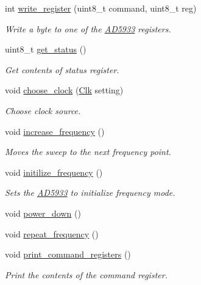 \begin{DoxyCompactItemize}
int \mbox{\hyperlink{struct_a_d5933_a19776e361cd7e0f8139637a186d83f63}{write\+\_\+register}} (uint8\+\_\+t command, uint8\+\_\+t reg)
\begin{DoxyCompactList}\small\item\em Write a byte to one of the \mbox{\hyperlink{struct_a_d5933}{A\+D5933}} registers. \end{DoxyCompactList}\item 
uint8\+\_\+t \mbox{\hyperlink{struct_a_d5933_aa2c2053a63395fc76be01a00b91e1bec}{get\+\_\+status}} ()
\begin{DoxyCompactList}\small\item\em Get contents of status register. \end{DoxyCompactList}\item 
void \mbox{\hyperlink{struct_a_d5933_ac1504cf786233e9802f80aac58a89ef7}{choose\+\_\+clock}} (\mbox{\hyperlink{ad5933_8hpp_a252769b931abfc990c5d5396cc352d35}{Clk}} setting)
\begin{DoxyCompactList}\small\item\em Choose clock source. \end{DoxyCompactList}\item 
void \mbox{\hyperlink{struct_a_d5933_ab0d13523bbb22eae6366815077540958}{increase\+\_\+frequency}} ()
\begin{DoxyCompactList}\small\item\em Moves the sweep to the next frequency point. \end{DoxyCompactList}\item 
void \mbox{\hyperlink{struct_a_d5933_a622c24c6cae2aa2e0079fcd17e2e2453}{initilize\+\_\+frequency}} ()
\begin{DoxyCompactList}\small\item\em Sets the \mbox{\hyperlink{struct_a_d5933}{A\+D5933}} to initialize frequency mode. \end{DoxyCompactList}\item 
void \mbox{\hyperlink{struct_a_d5933_afa4853c8fab1437072b6c8d860a99e2d}{power\+\_\+down}} ()
\item 
void \mbox{\hyperlink{struct_a_d5933_ae45640525e7312ee70e98bb6f1a0c3ae}{repeat\+\_\+frequency}} ()
\item 
void \mbox{\hyperlink{struct_a_d5933_a789fe15e33f626caf0cfc3e068062c26}{print\+\_\+command\+\_\+registers}} ()
\begin{DoxyCompactList}\small\item\em Print the contents of the command register. \end{DoxyCompactList}\item 

\end{DoxyCompactItemize}
